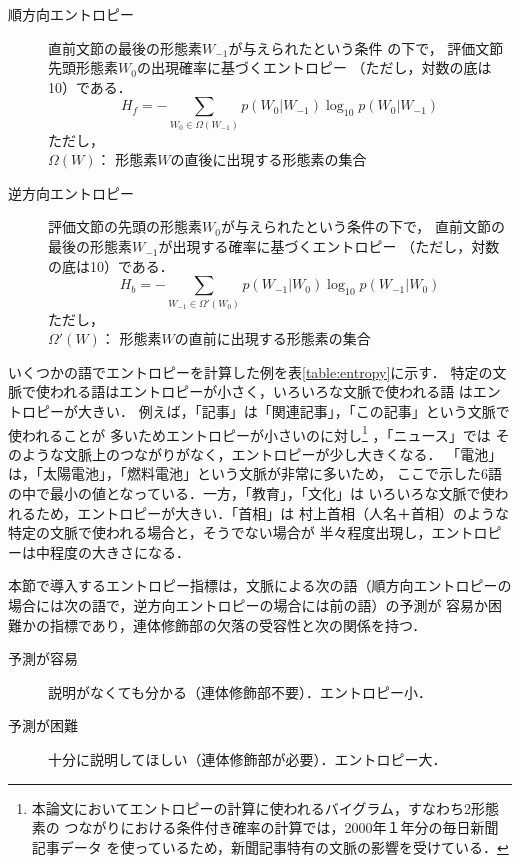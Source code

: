 \documentclass[japanese]{jnlp_1.3e}
\begin{document}
 \begin{description}
  \item [順方向エントロピー]
	      直前文節の最後の形態素$W_{-1}$が与えられたという条件
	      の下で，
	      評価文節先頭形態素$W_0$の出現確率に基づくエントロピー
	      （ただし，対数の底は10）である．
	      \[
	       H_f = - \sum_{W_0 \in \Omega(W_{-1})}p(W_0 \vert
	      W_{-1})\log_{10}p(W_0 \vert W_{-1})
	      \]
	      ただし，\\
	      $\Omega(W)$： 形態素$W$の直後に出現する形態素の集合
  \item [逆方向エントロピー]
	      評価文節の先頭の形態素$W_0$が与えられたという条件の下で，
	      直前文節の最後の形態素$W_{-1}$が出現する確率に基づくエントロピー
	      （ただし，対数の底は10）である．
	      \[
	       H_b = - \sum_{W_{-1} \in \Omega'(W_{0})}p(W_{-1} \vert
	      W_{0})\log_{10}p(W_{-1} \vert W_{0})
	      \]
	      ただし，\\
	      $\Omega'(W)$： 形態素$W$の直前に出現する形態素の集合
 \end{description}

\begin{table}[b]

\end{table}

いくつかの語でエントロピーを計算した例を表\ref{table:entropy}に示す．
特定の文脈で使われる語はエントロピーが小さく，いろいろな文脈で使われる語
はエントロピーが大きい．
例えば，「記事」は「関連記事」，「この記事」という文脈で使われることが
多いためエントロピーが小さいのに対し\footnote{本論文においてエントロピーの計算に使われるバイグラム，すなわち2形態素の
つながりにおける条件付き確率の計算では，2000年１年分の毎日新聞記事データ
を使っているため，新聞記事特有の文脈の影響を受けている．} ，「ニュース」では
そのような文脈上のつながりがなく，エントロピーが少し大きくなる．
「電池」は，「太陽電池」，「燃料電池」という文脈が非常に多いため，
ここで示した6語の中で最小の値となっている．一方，「教育」，「文化」は
いろいろな文脈で使われるため，エントロピーが大きい．「首相」は
村上首相（人名＋首相）のような特定の文脈で使われる場合と，そうでない場合が
半々程度出現し，エントロピーは中程度の大きさになる．

本節で導入するエントロピー指標は，文脈による次の語（順方向エントロピーの
場合には次の語で，逆方向エントロピーの場合には前の語）の予測が
容易か困難かの指標であり，連体修飾部の欠落の受容性と次の関係を持つ．
 \begin{description}
  \item [予測が容易]
	      説明がなくても分かる（連体修飾部不要）．エントロピー小．
  \item [予測が困難]
	      十分に説明してほしい（連体修飾部が必要）．エントロピー大．
 \end{description}
\end{document}
